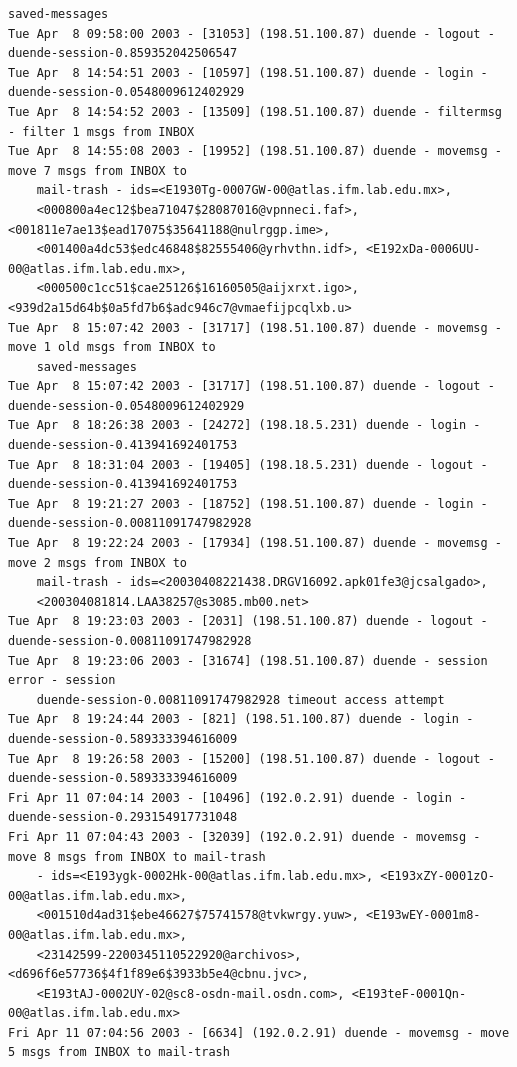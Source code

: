 \begin{lstlisting}[style=terminal]
    saved-messages
Tue Apr  8 09:58:00 2003 - [31053] (198.51.100.87) duende - logout - duende-session-0.859352042506547
Tue Apr  8 14:54:51 2003 - [10597] (198.51.100.87) duende - login - duende-session-0.0548009612402929
Tue Apr  8 14:54:52 2003 - [13509] (198.51.100.87) duende - filtermsg - filter 1 msgs from INBOX
Tue Apr  8 14:55:08 2003 - [19952] (198.51.100.87) duende - movemsg - move 7 msgs from INBOX to 
    mail-trash - ids=<E1930Tg-0007GW-00@atlas.ifm.lab.edu.mx>, 
    <000800a4ec12$bea71047$28087016@vpnneci.faf>, <001811e7ae13$ead17075$35641188@nulrggp.ime>, 
    <001400a4dc53$edc46848$82555406@yrhvthn.idf>, <E192xDa-0006UU-00@atlas.ifm.lab.edu.mx>, 
    <000500c1cc51$cae25126$16160505@aijxrxt.igo>, <939d2a15d64b$0a5fd7b6$adc946c7@vmaefijpcqlxb.u>
Tue Apr  8 15:07:42 2003 - [31717] (198.51.100.87) duende - movemsg - move 1 old msgs from INBOX to 
    saved-messages
Tue Apr  8 15:07:42 2003 - [31717] (198.51.100.87) duende - logout - duende-session-0.0548009612402929
Tue Apr  8 18:26:38 2003 - [24272] (198.18.5.231) duende - login - duende-session-0.413941692401753
Tue Apr  8 18:31:04 2003 - [19405] (198.18.5.231) duende - logout - duende-session-0.413941692401753
Tue Apr  8 19:21:27 2003 - [18752] (198.51.100.87) duende - login - duende-session-0.00811091747982928
Tue Apr  8 19:22:24 2003 - [17934] (198.51.100.87) duende - movemsg - move 2 msgs from INBOX to 
    mail-trash - ids=<20030408221438.DRGV16092.apk01fe3@jcsalgado>, 
    <200304081814.LAA38257@s3085.mb00.net>
Tue Apr  8 19:23:03 2003 - [2031] (198.51.100.87) duende - logout - duende-session-0.00811091747982928
Tue Apr  8 19:23:06 2003 - [31674] (198.51.100.87) duende - session error - session 
    duende-session-0.00811091747982928 timeout access attempt
Tue Apr  8 19:24:44 2003 - [821] (198.51.100.87) duende - login - duende-session-0.589333394616009
Tue Apr  8 19:26:58 2003 - [15200] (198.51.100.87) duende - logout - duende-session-0.589333394616009
Fri Apr 11 07:04:14 2003 - [10496] (192.0.2.91) duende - login - duende-session-0.293154917731048
Fri Apr 11 07:04:43 2003 - [32039] (192.0.2.91) duende - movemsg - move 8 msgs from INBOX to mail-trash 
    - ids=<E193ygk-0002Hk-00@atlas.ifm.lab.edu.mx>, <E193xZY-0001zO-00@atlas.ifm.lab.edu.mx>, 
    <001510d4ad31$ebe46627$75741578@tvkwrgy.yuw>, <E193wEY-0001m8-00@atlas.ifm.lab.edu.mx>, 
    <23142599-2200345110522920@archivos>, <d696f6e57736$4f1f89e6$3933b5e4@cbnu.jvc>, 
    <E193tAJ-0002UY-02@sc8-osdn-mail.osdn.com>, <E193teF-0001Qn-00@atlas.ifm.lab.edu.mx>
Fri Apr 11 07:04:56 2003 - [6634] (192.0.2.91) duende - movemsg - move 5 msgs from INBOX to mail-trash 

\end{lstlisting}
